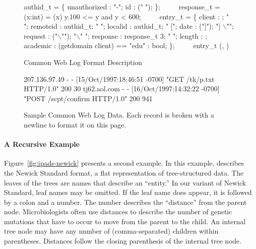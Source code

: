 
\begin{figure}
{\small
\begin{code}
authid\_t = \Punion{} \{
  unauthorized : "-";
  id           : \Pstring (" ");
\};
\(\qquad\)
response\_t =
  \Pfun(x:int) =
   (x) \Pwhere{} y.100 <= y and y < 600;
\(\qquad\)
entry\_t = \Pstruct{} \{
  client   : \Pip{};             " ";
  remoteid : authid\_t;        " ";
  localid  : authid\_t;        " [";
  date     : \Pdate("]");      "] \(\backslash\)"";
  request  : \Pstring("\(\backslash\)"");   "\(\backslash\)" ";
  response : response\_t 3;    " "; 
  length   : \Puint{};
  academic : \Pcompute (getdomain client) == "edu" : bool;
\};
\(\qquad\)
entry\_t \Parray{}(\Peor, \Peof)
\end{code}

\caption{\ipads{} Common Web Log Format Description}
\label{fig:ipads-clf}
}
\end{figure}

\begin{figure}
{\small
\begin{code}
{}207.136.97.49 - - [15/Oct/1997:18:46:51 -0700] 
"GET /tk/p.txt HTTP/1.0" 200 30
tj62.aol.com - - [16/Oct/1997:14:32:22 -0700] 
"POST /scpt/confirm HTTP/1.0" 200 941
\end{code}
\caption{Sample Common Web Log Data. Each record is broken with a
  newline to format it on this page.}
\label{fig:ipads-clf-data}
}
\end{figure}

\paragraph*{A Recursive \ipads{} Example}
Figure~\ref{fig:ipads-newick} presents a second \ipads{} example.
In this example, \ipads{} describes the Newick Standard format, a flat
representation of tree-structured data.  The leaves of the trees
are names that describe an ``entity.''   In our variant of Newick Standard, 
leaf names may be omitted.  If the leaf name does appear,
it is followed by a colon and a number.  The number describes the ``distance''
from the parent node.  Microbiologists often use
distances to describe the
number of genetic mutations that have to occur to move from the parent 
to the child.  An internal tree node may have any number of (comma-separated)
children within parentheses.  Distances follow the closing parenthesis
of the internal tree node.

